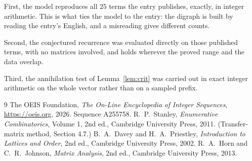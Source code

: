 \documentclass[11pt,a4paper]{article}
\theoremstyle{plain}
\theoremstyle{definition}
\begin{document}
First, the model reproduces all $25$ terms the entry publishes, exactly, in integer
arithmetic. This is what ties the model to the entry: the digraph is built by reading the
entry's English, and a misreading gives different counts.

Second, the conjectured recurrence was evaluated directly on those published terms, with no
matrices involved, and holds wherever the proved range and the data overlap.

Third, the annihilation test of Lemma~\ref{lem:crit} was carried out in exact integer
arithmetic on the whole vector rather than on a sampled prefix.

\begin{thebibliography}{9}
 The OEIS Foundation, \emph{The On-Line Encyclopedia of Integer
Sequences}, \url{https://oeis.org}, 2026. Sequence A255758.
 R.~P.~Stanley, \emph{Enumerative Combinatorics}, Volume 1, 2nd ed.,
Cambridge University Press, 2011. (Transfer-matrix method, Section 4.7.)
 B.~A.~Davey and H.~A.~Priestley, \emph{Introduction to Lattices and
Order}, 2nd ed., Cambridge University Press, 2002.
 R.~A.~Horn and C.~R.~Johnson, \emph{Matrix Analysis}, 2nd ed., Cambridge
University Press, 2013.
\end{thebibliography}
\end{document}
